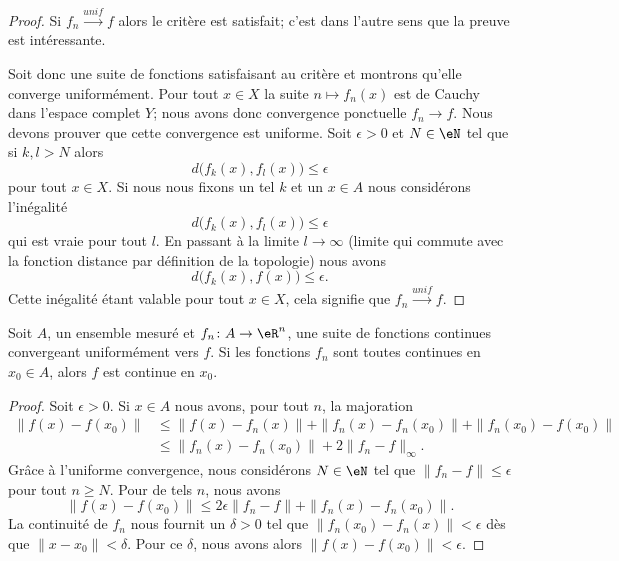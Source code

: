\begin{proof}
    Si \( f_n\stackrel{unif}{\longrightarrow}f\) alors le critère est satisfait; c'est dans l'autre sens que la preuve est intéressante.

    Soit donc une suite de fonctions satisfaisant au critère et montrons qu'elle converge uniformément. Pour tout \( x\in X\) la suite \( n\mapsto f_n(x)\) est de Cauchy dans l'espace complet \( Y\); nous avons donc convergence ponctuelle \( f_n\to f\). Nous devons prouver que cette convergence est uniforme. Soit \( \epsilon>0\) et \( N\in \eN\) tel que si \( k,l>N\) alors
    \begin{equation}
        d\big( f_k(x),f_l(x) \big)\leq \epsilon
    \end{equation}
    pour tout \( x\in X\). Si nous nous fixons un tel \( k\) et un \( x\in A\) nous considérons l'inégalité
    \begin{equation}
        d\big( f_k(x),f_l(x) \big)\leq \epsilon
    \end{equation}
    qui est vraie pour tout \( l\). En passant à la limite \( l\to\infty\) (limite qui commute avec la fonction distance par définition de la topologie) nous avons
    \begin{equation}
        d\big( f_k(x),f(x) \big)\leq \epsilon.
    \end{equation}
    Cette inégalité étant valable pour tout \( x\in X\), cela signifie que \( f_n\stackrel{unif}{\longrightarrow}f\).
\end{proof}

\begin{theorem}			\label{ThoUnigCvCont}
    Soit \( A\), un ensemble mesuré et \( f_n\colon A\to \eR^n\), une suite de fonctions continues convergeant uniformément vers \( f\). Si les fonctions \( f_n\) sont toutes continues en \( x_0\in A\), alors \( f\) est continue en \( x_0\).
\end{theorem}

\begin{proof}
    Soit \( \epsilon>0\). Si \( x\in A\) nous avons, pour tout \( n\), la majoration
    \begin{subequations}
        \begin{align}
            \| f(x)-f(x_0) \|&\leq \| f(x)-f_n(x) \|+\| f_n(x)-f_n(x_0) \|+\| f_n(x_0)-f(x_0) \|\\
            &\leq\| f_n(x)-f_n(x_0) \|+2\| f_n-f \|_{\infty}.
        \end{align}
    \end{subequations}
    Grâce à l'uniforme convergence, nous considérons \(N\in \eN\) tel que \( \| f_n-f \|\leq \epsilon\) pour tout \( n\geq N\). Pour de tels \( n\), nous avons
    \begin{equation}
        \| f(x)-f(x_0) \|\leq 2\epsilon\| f_n-f \|+\| f_n(x)-f_n(x_0) \|.
    \end{equation}
    La continuité de \( f_n\) nous fournit un \( \delta>0\) tel que \( \| f_n(x_0)-f_n(x) \|<\epsilon\) dès que \( \| x-x_0 \|<\delta\). Pour ce \( \delta\), nous avons alors \( \| f(x)-f(x_0) \|<\epsilon\).
\end{proof}

